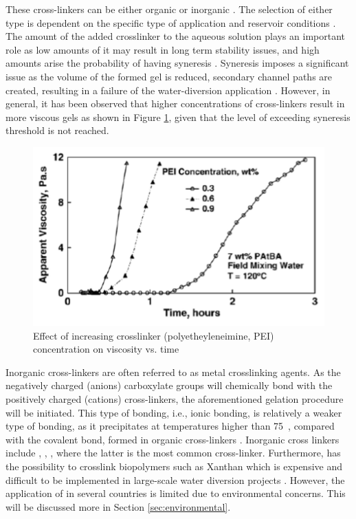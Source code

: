 These cross-linkers can be either organic or inorganic \citep{Al-Muntasheri2012}. The selection of either type is dependent on the specific type of application and reservoir conditions \citep{Ball1984}. The amount of the added crosslinker to the aqueous solution plays an important role as low amounts of it may result in long term stability issues, and high amounts arise the probability of having syneresis \citep{Sydansk1993, eggert1992}. Syneresis imposes a significant issue as the volume of the formed gel is reduced, secondary channel paths are created, resulting in a failure of the water-diversion application \citep{Al-Muntasheri2007}. However, in general, it has been observed that higher concentrations of cross-linkers result in more viscous gels as shown in Figure \ref{fig:crosslinkerConc}, given that the level of exceeding syneresis threshold is not reached.

\begin{figure}
    \centering
    \includegraphics[width=\textwidth]{img/fig/crosslinkerConc.png}
    \caption{Effect of increasing crosslinker (polyetheyleneimine, PEI) concentration on viscosity vs. time \citep{Al-Muntasheri2007}}
    \label{fig:crosslinkerConc} %
\end{figure}

Inorganic cross-linkers are often referred to as metal crosslinking agents. As the negatively charged (anions) carboxylate groups will chemically bond with the positively charged (cations) cross-linkers, the aforementioned gelation procedure will be initiated. This type of bonding, i.e., ionic bonding, is relatively a weaker type of bonding, as it precipitates at temperatures higher than 75~\celsius, compared with the covalent bond, formed in organic cross-linkers \citep{Al-Muntasheri2005}. Inorganic cross linkers include , , , where the latter is the most common cross-linker. Furthermore,  has the possibility to crosslink biopolymers such as Xanthan which is expensive and difficult to be implemented in large-scale water diversion projects \citep{Al-Muntasheri2012}. However, the application of  in several countries is limited due to environmental concerns. This will be discussed more in Section \ref{sec:environmental}.

